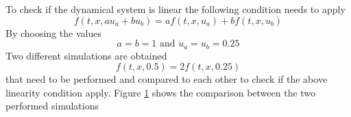 To check if the dynamical system is linear the following condition needs to apply
$$
f(t,x,au_a+bu_b) = af(t,x,u_a) + bf(t,x,u_b)
$$
By choosing the values 
$$
a = b = 1 \text{ and } u_a = u_b = 0.25
$$
Two different simulations are obtained
$$
f(t,x,0.5) = 2f(t,x,0.25)
$$
that need to be performed and compared to each other to check if the above linearity condition apply.
Figure \ref{fig:LinComp} shows the comparison between the two performed simulations

\begin{figure}[ht]
    \centering
    
    \caption{ }
    \label{fig:LinComp}
\end{figure}
